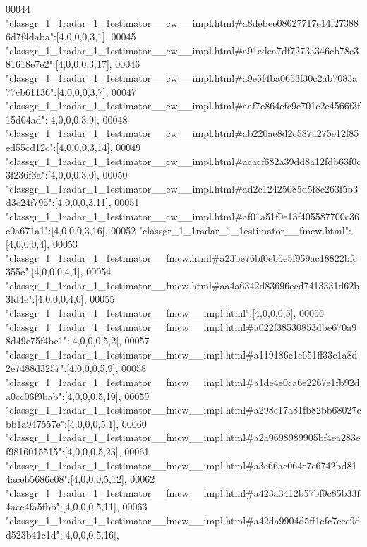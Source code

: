 \begin{DoxyCode}
00044 \textcolor{stringliteral}{"classgr\_1\_1radar\_1\_1estimator\_\_cw\_\_impl.html#a8debee08627717e14f273886d7f4daba"}:[4,0,0,0,3,1],
00045 \textcolor{stringliteral}{"classgr\_1\_1radar\_1\_1estimator\_\_cw\_\_impl.html#a91edea7df7273a346cb78c381618e7e2"}:[4,0,0,0,3,17],
00046 \textcolor{stringliteral}{"classgr\_1\_1radar\_1\_1estimator\_\_cw\_\_impl.html#a9e5f4ba0653f30c2ab7083a77cb61136"}:[4,0,0,0,3,7],
00047 \textcolor{stringliteral}{"classgr\_1\_1radar\_1\_1estimator\_\_cw\_\_impl.html#aaf7e864cfc9e701c2e4566f3f15d04ad"}:[4,0,0,0,3,9],
00048 \textcolor{stringliteral}{"classgr\_1\_1radar\_1\_1estimator\_\_cw\_\_impl.html#ab220ae8d2c587a275e12f85ed55cd12c"}:[4,0,0,0,3,14],
00049 \textcolor{stringliteral}{"classgr\_1\_1radar\_1\_1estimator\_\_cw\_\_impl.html#acacf682a39dd8a12fdb63f0c3f236f3a"}:[4,0,0,0,3,0],
00050 \textcolor{stringliteral}{"classgr\_1\_1radar\_1\_1estimator\_\_cw\_\_impl.html#ad2c12425085d5f8c263f5b3d3c24f795"}:[4,0,0,0,3,11],
00051 \textcolor{stringliteral}{"classgr\_1\_1radar\_1\_1estimator\_\_cw\_\_impl.html#af01a51f0e13f405587700c36e0a671a1"}:[4,0,0,0,3,16],
00052 \textcolor{stringliteral}{"classgr\_1\_1radar\_1\_1estimator\_\_fmcw.html"}:[4,0,0,0,4],
00053 \textcolor{stringliteral}{"classgr\_1\_1radar\_1\_1estimator\_\_fmcw.html#a23be76bf0eb5e5f959ac18822bfc355e"}:[4,0,0,0,4,1],
00054 \textcolor{stringliteral}{"classgr\_1\_1radar\_1\_1estimator\_\_fmcw.html#aa4a6342d83696ecd7413331d62b3fd4e"}:[4,0,0,0,4,0],
00055 \textcolor{stringliteral}{"classgr\_1\_1radar\_1\_1estimator\_\_fmcw\_\_impl.html"}:[4,0,0,0,5],
00056 \textcolor{stringliteral}{"classgr\_1\_1radar\_1\_1estimator\_\_fmcw\_\_impl.html#a022f38530853dbe670a98d49e75f4bc1"}:[4,0,0,0,5,2],
00057 \textcolor{stringliteral}{"classgr\_1\_1radar\_1\_1estimator\_\_fmcw\_\_impl.html#a119186c1c651ff33c1a8d2e7488d3257"}:[4,0,0,0,5,9],
00058 \textcolor{stringliteral}{"classgr\_1\_1radar\_1\_1estimator\_\_fmcw\_\_impl.html#a1de4e0ca6e2267e1fb92da0cc06f9bab"}:[4,0,0,0,5,19],
00059 \textcolor{stringliteral}{"classgr\_1\_1radar\_1\_1estimator\_\_fmcw\_\_impl.html#a298e17a81fb82bb68027cbb1a947557e"}:[4,0,0,0,5,1],
00060 \textcolor{stringliteral}{"classgr\_1\_1radar\_1\_1estimator\_\_fmcw\_\_impl.html#a2a9698989905bf4ea283ef9816015515"}:[4,0,0,0,5,23],
00061 \textcolor{stringliteral}{"classgr\_1\_1radar\_1\_1estimator\_\_fmcw\_\_impl.html#a3e66ac064e7e6742bd814aceb5686c08"}:[4,0,0,0,5,12],
00062 \textcolor{stringliteral}{"classgr\_1\_1radar\_1\_1estimator\_\_fmcw\_\_impl.html#a423a3412b57bf9c85b33f4ace4fa5fbb"}:[4,0,0,0,5,11],
00063 \textcolor{stringliteral}{"classgr\_1\_1radar\_1\_1estimator\_\_fmcw\_\_impl.html#a42da9904d5ff1efc7cec9dd523b41c1d"}:[4,0,0,0,5,16],

\end{DoxyCode}
